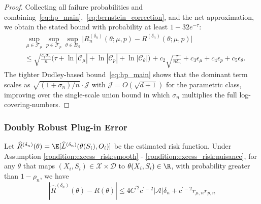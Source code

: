 \begin{proof}
Collecting all failure probabilities and combining~\eqref{eq:hp_main},~\eqref{eq:bernstein_correction}, and the net approximation, we obtain the stated bound with probability at least $1-32e^{-\tau}$:
\begin{align*}
&\sup_{\mu\in\mathcal{F}_\mu}\sup_{p\in\mathcal{F}_p}\sup_{\theta\in B_\beta}\bigl|R_n^{(\delta_n)}(\theta;\mu,p)-R^{(\delta_n)}(\theta;\mu,p)\bigr|\\
&\leq \sqrt{\frac{c_1\sigma_n}{n}\bigl(\tau+\ln|\mathcal{C}_\mu|+\ln|\mathcal{C}_p|+\ln|\mathcal{C}_\theta|\bigr)} + c_2\sqrt{\frac{\tau}{n\delta_n}} + c_3\epsilon_\mu + c_4\epsilon_p + c_5\epsilon_\theta.
\end{align*}
The tighter Dudley-based bound~\eqref{eq:hp_main} shows that the dominant term scales as $\sqrt{(1+\sigma_n)/n}\cdot\mathcal{J}$ with $\mathcal{J}=O(\sqrt{d+1})$ for the parametric class, improving over the single-scale union bound in which $\sigma_n$ multiplies the full log-covering-numbers.
\end{proof}


\subsubsection{Doubly Robust Plug-in Error}

\begin{lemma}\label{lemma:risk_function_plug_in_error}
    Let $\widehat R^{({\delta_n})}(\theta) = \E[\widehat L^{({\delta_n})}(\theta(S_i),O_i)]$ be the estimated risk function. Under Assumption \ref{condition:excess_risk:smooth} - \ref{condition:excess_risk:nuisance}, for any $\theta$ that maps $(X_i,S_i)\in\mathcal{X}\times \mathcal{D}$ to $\theta(X_i,S_i)\in\R$, with probability greater than $1-\rho_n$,
    we have 
    $$|\widehat R^{({\delta_n})}(\theta) - R(\theta)|\leq 4C^{\prime2}c^{\prime-2}|\mathcal{A}|\delta_n + c^{\prime-2}r_{\mu,n}r_{p,n}$$
\end{lemma}

